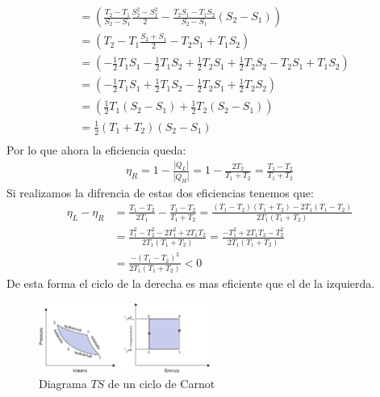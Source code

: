 \documentclass[a4paper]{article}
\begin{document}
\begin{answer}[Punto 9]
\begin{itemize}
\begin{align*}
                &= \left( \frac{T_2 - T_1 }{S_2 - S_1} \frac{S_2^2 - S_1^2}{2} - \frac{T_2S_1 - T_1S_2}{S_2 - S_1} (S_2 - S_1)\right)\\
                &=\left( T_2 - T_1 \frac{S_2 + S_1}{2} - T_2S_1 + T_1S_2\right)\\
                &= \left(-\frac 12 T_1S_1 - \frac 12 T_1 S_2 + \frac 12 T_2 S_1 + \frac 12 T_2 S_2  - T_2S_1 +T_1S_2\right)\\
                &= \left( -\frac 12 T_1 S_1 + \frac 12 T_1 S_2 - \frac 12 T_2 S_1 + \frac 12 T_2 S_2 \right)\\
                &= \left( \frac 12 T_1 (S_2 - S_1) + \frac 12 T_2 (S_2- S_1) \right)\\
                &= \frac 12 (T_1 + T_2) (S_2 - S_1)\\
            \end{align*}
            Por lo que ahora la eficiencia queda:
            \begin{align*}
                \eta_R = 1 - \frac{|Q_L|}{|Q_H|} = 1 - \frac{2T_2}{T_1 + T_2} = \frac{T_1 - T_2}{T_1+T_2}
            \end{align*}
            Si realizamos la difrencia de estas dos eficiencias tenemos que:
            \begin{align*}
                \eta_L - \eta_R &= \frac{T_1 - T_2}{2T_1} - \frac{T_1 - T_2}{T_1+T_2} = \frac{(T_1 - T_2)(T_1 + T_2) - 2T_1(T_1 - T_2)}{2T_1(T_1 + T_2)}\\
                &= \frac {T_1^2 - T_2^2 - 2T_1^2 + 2T_1T_2}{2T_1(T_1 + T_2)} = \frac{-T_1^2 + 2T_1T_2 - T_2^2}{2T_1(T_1 + T_2)}\\
                &= \frac{-(T_1 - T_2)^2}{2T_1(T_1 + T_2)} < 0 
            \end{align*}
            De esta forma el ciclo de la derecha es mas eficiente que el de la izquierda.

        \end{itemize}
        
    \end{answer}

    \begin{figure}[h]
        \centering
        \includegraphics[width=0.5\textwidth]{Diagrama3.png}
        \caption{Diagrama $TS$ de un ciclo de Carnot}
    \end{figure}
\end{document}
